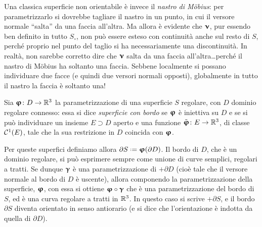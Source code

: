 Una classica superficie non orientabile è invece il \emph{nastro di M\"obius}: per parametrizzarlo si dovrebbe tagliare il nastro in un punto, in cui il versore normale ``salta'' da una faccia all'altra.
Ma allora è evidente che $\bm{\upnu}$, pur essendo ben definito in tutto $S_\circ$, non può essere esteso con continuità anche sul resto di $S$, perch\'e proprio nel punto del taglio si ha necessariamente una discontinuità.
In realtà, non sarebbe corretto dire che $\bm{\upnu}$ salta da una faccia all'altra\dots perch\'e il nastro di M\"obius ha soltanto una faccia.
Sebbene localmente si possano individuare due facce (e quindi due versori normali opposti), globalmente in tutto il nastro la faccia è soltanto una!

\begin{definizione} \label{d:superfici-con-bordo}
	Sia $\bm{\upvarphi}\colon D\to\mathbb{R}^3$ la parametrizzazione di una superficie $S$ regolare, con $D$ dominio regolare connesso: essa si dice \emph{superficie con bordo} se $\bm{\upvarphi}$ è iniettiva su $D$ e se si può individuare un insieme $E\supset D$ aperto e una funzione $\tilde{\bm{\upvarphi}}\colon E\to\mathbb{R}^3$, di classe $\mathcal{C}^{{1}}(E)$, tale che la sua restrizione in $D$ coincida con $\bm{\upvarphi}$.
\end{definizione}
Per queste superfici definiamo allora $\partial S\defeq\vphi(\partial D)$.
Il bordo di $D$, che è un dominio regolare, si può esprimere sempre come unione di curve semplici, regolari a tratti.
Se dunque $\bm{\upgamma}$ è una parametrizzazione di $+\partial D$ (cioè tale che il versore normale al bordo di $D$ è uscente), allora componendo la parametrizzazione della superficie, $\bm{\upvarphi}$, con essa si ottiene $\bm{\upvarphi}\circ\bm{\upgamma}$ che è una parametrizzazione del bordo di $S$, ed è una curva regolare a tratti in $\mathbb{R}^3$.
In questo caso si scrive $+\partial S$, e il bordo $\partial S$ diventa orientato in senso antiorario (e si dice che l'orientazione è indotta da quella di $\partial D$).

